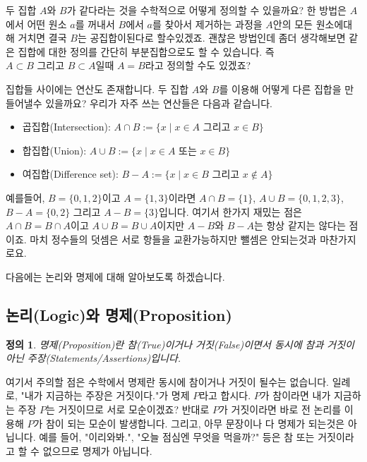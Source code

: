 \documentclass[a4paper, 11pt]{report}
\renewcommand{\<}{\langle}
\renewcommand{\>}{\rangle}
\newtheorem{dfn}[thm]{정의}
\begin{document}
두 집합 $A$와 $B$가 같다라는 것을 수학적으로 어떻게 정의할 수 있을까요? 한 방법은 $A$에서 어떤 
원소 $a$를 꺼내서 $B$에서 $a$를 찾아서 제거하는 과정을 $A$안의 모든 원소에대해 거치면 결국
$B$는 공집합이된다로 할수있겠죠. 괜찮은 방법인데 좀더 생각해보면 같은 집합에 대한 정의를 간단히
부분집합으로도 할 수 있습니다. 즉 $A \subset B \text{ 그리고 } B \subset A$일때 $A = B$라고 
정의할 수도 있겠죠?

집합들 사이에는 연산도 존재합니다. 두 집합 $A$와 $B$를 이용해 어떻게 다른 집합을 만들어낼수 있을까요?
우리가 자주 쓰는 연산들은 다음과 같습니다.

\begin{itemize}
  \item 곱집합(Intersection): $A \cap B := \{x \mid x \in A \text{ 그리고 } x \in B\}$
  \item 합집합(Union): $A \cup B := \{x \mid x \in A \text{ 또는 } x \in B\}$
  \item 여집합(Difference set): $B - A := \{x \mid x \in B \text{ 그리고 } x \not\in A\}$
\end{itemize}

예를들어, $B = \{0, 1, 2\}$이고 $A = \{1, 3\}$이라면 $A \cap B = \{1\}$, 
$A \cup B = \{0, 1, 2, 3\}$, $B - A = \{0, 2\}$ 그리고 $A - B = \{3\}$입니다. 여기서 한가지
재밌는 점은 $A \cap B = B \cap A$이고 $A \cup B = B \cup A$이지만 $A -B$와 $B - A$는 항상
같지는 않다는 점이죠. 마치 정수들의 덧셈은 서로 항들을 교환가능하지만 뺄셈은 안되는것과 마찬가지로요.

다음에는 논리와 명제에 대해 알아보도록 하겠습니다.

\subsection{논리(Logic)와 명제(Proposition)}

\begin{dfn}
  명제(Proposition)란 참(True)이거나 거짓(False)이면서 동시에 참과 거짓이 
  아닌 주장(Statements/Assertions)입니다. 
\end{dfn}

여기서 주의할 점은 수학에서 명제란 동시에 참이거나 거짓이 될수는 없습니다. 일례로, 
"내가 지금하는 주장은 거짓이다."가 명제 $P$라고 합시다. $P$가 참이라면 내가 지금하는 
주장 $P$는 거짓이므로 서로 모순이겠죠? 반대로 $P$가 거짓이라면 바로 전 논리를 이용해
$P$가 참이 되는 모순이 발생합니다. 그리고, 아무 문장이나 다 명제가 되는것은 아닙니다.
예를 들어, "이리와봐.", "오늘 점심엔 무엇을 먹을까?" 등은 참 또는 거짓이라고 할 수 
없으므로 명제가 아닙니다.
\end{document}
